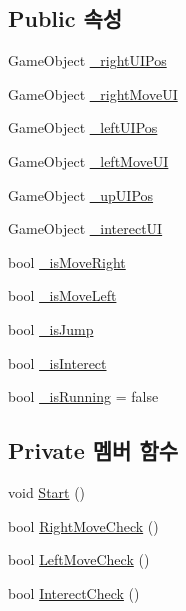 \subsection*{Public 속성}
\begin{DoxyCompactItemize}
\item 
Game\+Object \mbox{\hyperlink{class_tutorial_manager_a838caaf12f20fdcfce77cd55b9771073}{\+\_\+right\+U\+I\+Pos}}
\item 
Game\+Object \mbox{\hyperlink{class_tutorial_manager_a5c25f48e6be1940caa239b2fb0f311f6}{\+\_\+right\+Move\+UI}}
\item 
Game\+Object \mbox{\hyperlink{class_tutorial_manager_a0c22170975645ba9a1679a952e3ac1f2}{\+\_\+left\+U\+I\+Pos}}
\item 
Game\+Object \mbox{\hyperlink{class_tutorial_manager_a11eb25af75cf96158815fe023bd168ac}{\+\_\+left\+Move\+UI}}
\item 
Game\+Object \mbox{\hyperlink{class_tutorial_manager_a5c9726a561fe99901f13a34684b14984}{\+\_\+up\+U\+I\+Pos}}
\item 
Game\+Object \mbox{\hyperlink{class_tutorial_manager_a4a15e2de791bbeec4dfff6ec9660603f}{\+\_\+interect\+UI}}
\item 
bool \mbox{\hyperlink{class_tutorial_manager_a808970672c69ff7258a661970ddb049a}{\+\_\+is\+Move\+Right}}
\item 
bool \mbox{\hyperlink{class_tutorial_manager_a1f9d9119b781b616ac5c9e698f65769a}{\+\_\+is\+Move\+Left}}
\item 
bool \mbox{\hyperlink{class_tutorial_manager_ab20f75bf65dd2f48852adbaf97285137}{\+\_\+is\+Jump}}
\item 
bool \mbox{\hyperlink{class_tutorial_manager_a19143aca94b5058a57a3db41d31d2a57}{\+\_\+is\+Interect}}
\item 
bool \mbox{\hyperlink{class_tutorial_manager_acc9109b98a2e1f071427b7005fd94d45}{\+\_\+is\+Running}} = false
\end{DoxyCompactItemize}
\subsection*{Private 멤버 함수}
\begin{DoxyCompactItemize}
\item 
void \mbox{\hyperlink{class_tutorial_manager_a51ab9e8dbee6bbd7a9e59a1e86c62c72}{Start}} ()
\item 
bool \mbox{\hyperlink{class_tutorial_manager_a725025cd876fbd907721145acc30aa90}{Right\+Move\+Check}} ()
\item 
bool \mbox{\hyperlink{class_tutorial_manager_af3e698dd38b14d5d9dd076947bed6f71}{Left\+Move\+Check}} ()
\item 
bool \mbox{\hyperlink{class_tutorial_manager_a2e63bc12fb25813fa5b32f82b4eeed6a}{Interect\+Check}} ()
\end{DoxyCompactItemize}


